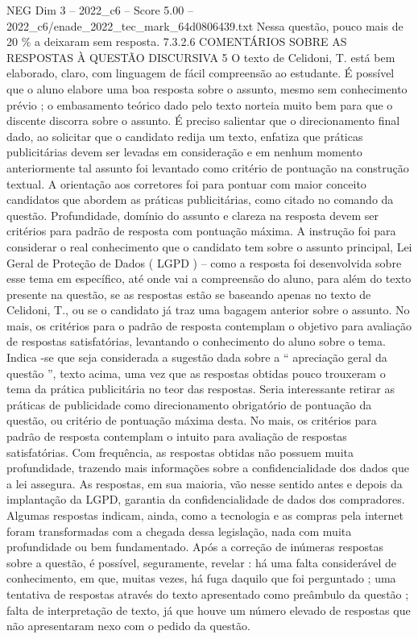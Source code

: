 \begin{textsample}{NEG Dim 3 – 2022\_c6 – Score 5.00 – 2022\_c6/enade\_2022\_tec\_mark\_64d0806439.txt}
Nessa questão, pouco mais de 20 \% a deixaram sem resposta. 7.3.2.6 COMENTÁRIOS SOBRE AS RESPOSTAS À QUESTÃO DISCURSIVA 5 O texto de Celidoni, T. está bem elaborado, claro, com linguagem de fácil compreensão ao estudante.
É possível que o aluno elabore uma boa resposta sobre o assunto, mesmo sem conhecimento prévio ; o embasamento teórico dado pelo texto norteia muito bem para que o discente discorra sobre o assunto.
É preciso salientar que o direcionamento final dado, ao solicitar que o candidato redija um texto, enfatiza que práticas publicitárias devem ser levadas em consideração e em nenhum momento anteriormente tal assunto foi levantado como critério de pontuação na construção textual.
A orientação aos corretores foi para pontuar com maior conceito candidatos que abordem as práticas publicitárias, como citado no comando da questão.
Profundidade, domínio do assunto e clareza na resposta devem ser critérios para padrão de resposta com pontuação máxima.
A instrução foi para considerar o real conhecimento que o candidato tem sobre o assunto principal, Lei Geral de Proteção de Dados ( LGPD ) – como a resposta foi desenvolvida sobre esse tema em específico, até onde vai a compreensão do aluno, para além do texto presente na questão, se as respostas estão se baseando apenas no texto de Celidoni, T., ou se o candidato já traz uma bagagem anterior sobre o assunto.
No mais, os critérios para o padrão de resposta contemplam o objetivo para avaliação de respostas satisfatórias, levantando o conhecimento do aluno sobre o tema.
Indica -se que seja considerada a sugestão dada sobre a “ apreciação geral da questão ”, texto acima, uma vez que as respostas obtidas pouco trouxeram o tema da prática publicitária no teor das respostas.
Seria interessante retirar as práticas de publicidade como direcionamento obrigatório de pontuação da questão, ou critério de pontuação máxima desta.
No mais, os critérios para padrão de resposta contemplam o intuito para avaliação de respostas satisfatórias.
Com frequência, as respostas obtidas não possuem muita profundidade, trazendo mais informações sobre a confidencialidade dos dados que a lei assegura.
As respostas, em sua maioria, vão nesse sentido antes e depois da implantação da LGPD, garantia da confidencialidade de dados dos compradores.
Algumas respostas indicam, ainda, como a tecnologia e as compras pela internet foram transformadas com a chegada dessa legislação, nada com muita profundidade ou bem fundamentado.
Após a correção de inúmeras respostas sobre a questão, é possível, seguramente, revelar : há uma falta considerável de conhecimento, em que, muitas vezes, há fuga daquilo que foi perguntado ; uma tentativa de respostas através do texto apresentado como preâmbulo da questão ; falta de interpretação de texto, já que houve um número elevado de respostas que não apresentaram nexo com o pedido da questão.

\end{textsample}
